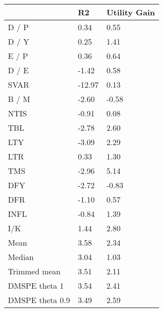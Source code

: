 
\begin{tabular}{lll}
    \toprule
    {} &      R2  &  Utility Gain \\
    \midrule

    D / P & 0.34& 0.55 \\
    D / Y & 0.25 & 1.41  \\
    E / P & 0.36 & 0.64  \\
    D / E & -1.42 & 0.58   \\
     SVAR  & -12.97 & 0.13   \\
    B / M & -2.60 & -0.58  \\
     NTIS  & -0.91 & 0.08 \\
     TBL  & -2.78 & 2.60 \\
     LTY  & -3.09 & 2.29\\
     LTR  & 0.33 & 1.30\\
     TMS  & -2.96 & 5.14\\
    DFY & -2.72 & -0.83\\
     DFR  & -1.10 & 0.57\\
     INFL  & -0.84 & 1.39\\
     I/K  & 1.44 & 2.80 \\
     Mean  & 3.58 & 2.34 \\
     Median  & 3.04 & 1.03 \\
     Trimmed mean  & 3.51 & 2.11 \\
     DMSPE theta 1 & 3.54 & 2.41 \\
     DMSPE theta 0.9 & 3.49 & 2.59
    \bottomrule
\end{tabular}